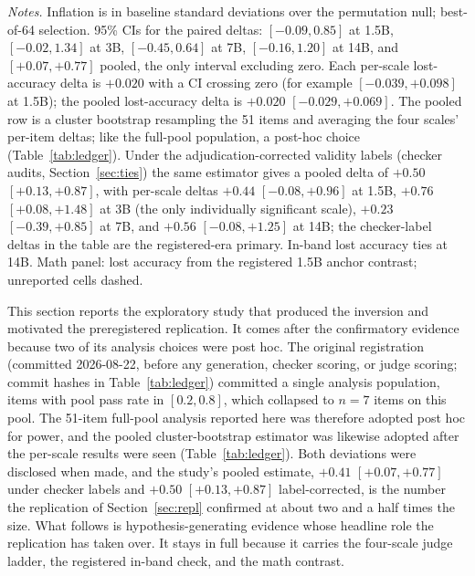 \documentclass[11pt]{article}
\begin{document}
\begin{table}[tbp]
\medskip
\begin{minipage}{0.97\textwidth}
\footnotesize
\emph{Notes.}
Inflation is in baseline standard deviations over the permutation null; best-of-64 selection.
95\% CIs for the paired deltas: $[-0.09, 0.85]$ at 1.5B, $[-0.02, 1.34]$ at 3B, $[-0.45, 0.64]$ at 7B, $[-0.16, 1.20]$ at 14B, and $[+0.07, +0.77]$ pooled, the only interval excluding zero.
Each per-scale lost-accuracy delta is $+0.020$ with a CI crossing zero (for example $[-0.039, +0.098]$ at 1.5B); the pooled lost-accuracy delta is $+0.020$ $[-0.029, +0.069]$.
The pooled row is a cluster bootstrap resampling the 51 items and averaging the four scales' per-item deltas; like the full-pool population, a post-hoc choice (Table~\ref{tab:ledger}).
Under the adjudication-corrected validity labels (checker audits, Section~\ref{sec:ties}) the same estimator gives a pooled delta of $+0.50$ $[+0.13, +0.87]$, with per-scale deltas $+0.44$ $[-0.08, +0.96]$ at 1.5B, $+0.76$ $[+0.08, +1.48]$ at 3B (the only individually significant scale), $+0.23$ $[-0.39, +0.85]$ at 7B, and $+0.56$ $[-0.08, +1.25]$ at 14B; the checker-label deltas in the table are the registered-era primary.
In-band lost accuracy ties at 14B.
Math panel: lost accuracy from the registered 1.5B anchor contrast; unreported cells dashed.
\end{minipage}
\caption{\textbf{Takeaway: on multi-valid tasks, adding the reference never helps, directionally hurts on every row, and the pooled inflation delta excludes zero, while the identical math protocol shows the reference collapsing inflation $4$--$13\times$.}
Exploratory Ties study, best-of-64 selection at four Qwen2.5 judge scales, in three panels: the post-hoc full pool ($n{=}51$ items), the registered in-band subset ($n{=}7$), and the unique-answer math contrast.
Higher is worse in every column.}
\label{tab:fullset}
\end{table}

This section reports the exploratory study that produced the inversion and motivated the preregistered replication.
It comes after the confirmatory evidence because two of its analysis choices were post hoc.
The original registration (committed 2026-08-22, before any generation, checker scoring, or judge scoring; commit hashes in Table~\ref{tab:ledger}) committed a single analysis population, items with pool pass rate in $[0.2, 0.8]$, which collapsed to $n{=}7$ items on this pool.
The 51-item full-pool analysis reported here was therefore adopted post hoc for power, and the pooled cluster-bootstrap estimator was likewise adopted after the per-scale results were seen (Table~\ref{tab:ledger}).
Both deviations were disclosed when made, and the study's pooled estimate, $+0.41$ $[+0.07, +0.77]$ under checker labels and $+0.50$ $[+0.13, +0.87]$ label-corrected, is the number the replication of Section~\ref{sec:repl} confirmed at about two and a half times the size.
What follows is hypothesis-generating evidence whose headline role the replication has taken over.
It stays in full because it carries the four-scale judge ladder, the registered in-band check, and the math contrast.
\end{document}
